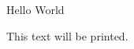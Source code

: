 \documentclass[a4paper]{article}
\begin{document}
Hello World

This text will be printed.
\end{document}

